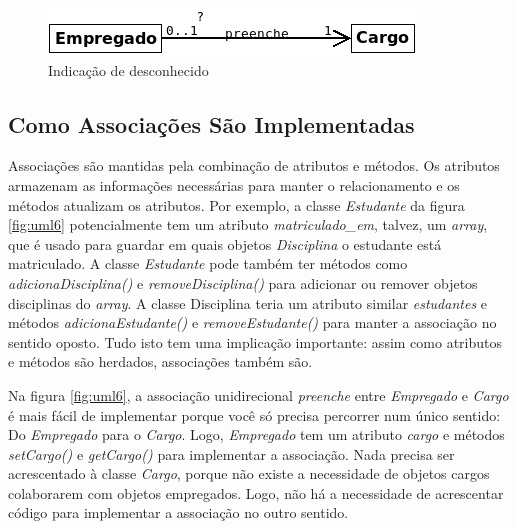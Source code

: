 \documentclass[
	11pt,				%
	openright,
	twoside,			%
	a4paper,			%
	english,			%
	french,
	brazil,				%
	sumario=tradicional
	]{abntex2}
\begin{document}
\begin{figure}[h]
\begin{center}
\includegraphics[scale=0.6]{assocCls3.png} 
\caption{Indicação de desconhecido} \label{fig:uml7}
\end{center}
\end{figure}

\subsection{Como Associações São Implementadas}

Associações são mantidas pela combinação de atributos e métodos. Os atributos armazenam as informações necessárias para manter o relacionamento e os métodos atualizam os atributos. Por exemplo, a classe \emph{Estudante} da figura \ref{fig:uml6} potencialmente tem um atributo \emph{matriculado\_em}, talvez, um \textit{array}, que é usado para guardar em quais objetos \emph{Disciplina} o estudante está matriculado. A classe \emph{Estudante} pode também ter métodos como \emph{adicionaDisciplina()} e \emph{removeDisciplina()} para adicionar ou remover objetos disciplinas do \textit{array}. A classe Disciplina teria um atributo similar \emph{estudantes} e métodos \emph{adicionaEstudante()} e \emph{removeEstudante()} para manter a associação no sentido oposto. Tudo isto tem uma implicação importante: assim como atributos e métodos são herdados, associações também são.

Na figura \ref{fig:uml6}, a associação unidirecional \emph{preenche} entre \emph{Empregado} e \emph{Cargo} é mais fácil de implementar porque você só precisa percorrer num único sentido: Do \emph{Empregado} para o \emph{Cargo}. Logo, \emph{Empregado} tem um atributo \emph{cargo} e métodos \emph{setCargo()} e \emph{getCargo()} para implementar a associação. Nada precisa ser acrescentado à classe \emph{Cargo}, porque não existe a necessidade de objetos cargos colaborarem com objetos empregados. Logo, não há a necessidade de acrescentar código para implementar a associação no outro sentido.

\noindent {}
\end{document}

